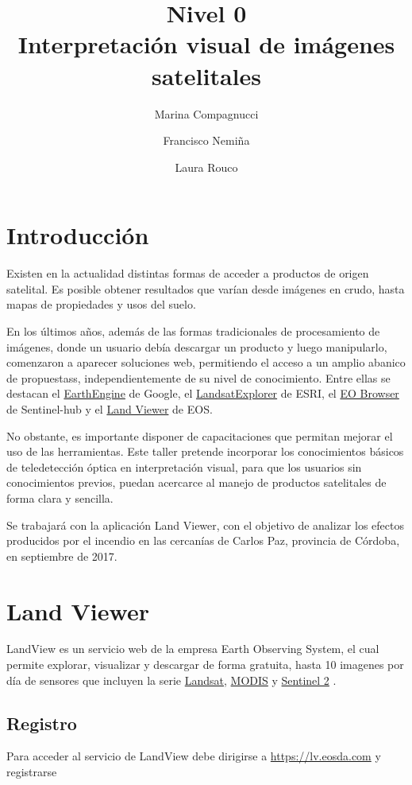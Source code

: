 \documentclass[a4paper,12pt]{book}
\title{{\large Nivel 0} \\ Interpretación visual de imágenes satelitales}
\author{Marina Compagnucci \and Francisco Nemiña \and Laura Rouco}
\begin{document}
\maketitle
\titlepage

\chapter{Introducción}
Existen en la actualidad distintas formas de acceder a productos de origen satelital. Es posible obtener resultados que varían desde imágenes en crudo, hasta mapas de propiedades y usos del suelo.

En los últimos años, además de las formas tradicionales de procesamiento de imágenes, donde un usuario debía descargar un producto y luego manipularlo, comenzaron a aparecer soluciones web, permitiendo el acceso a un amplio abanico de propuestass, independientemente de su nivel de conocimiento. Entre ellas se destacan el \href{https://explorer.earthengine.google.com/#workspace}{EarthEngine} de Google, el \href{http://landsatexplorer.esri.com/}{LandsatExplorer} de ESRI, el \href{http://apps.sentinel-hub.com/eo-browser/}{EO Browser} de Sentinel-hub y el \href{lv.eosda.com}{Land Viewer} de EOS.

No obstante, es importante disponer de capacitaciones que permitan mejorar el uso de las herramientas. Este taller pretende incorporar los conocimientos básicos de teledetección óptica en interpretación visual, para que los usuarios sin conocimientos previos, puedan acercarce al manejo de productos satelitales de forma clara y sencilla.

Se trabajará con la aplicación Land Viewer, con el objetivo de analizar los efectos producidos por el incendio en las cercanías de Carlos Paz, provincia de Córdoba, en septiembre de 2017.

\chapter{Land Viewer}

LandView es un servicio web de la empresa Earth Observing System, el cual permite explorar, visualizar y descargar de forma gratuita, hasta 10 imagenes por día de sensores que incluyen la serie \href{https://landsat.usgs.gov/}{Landsat}, \href{https://lpdaac.usgs.gov/dataset_discovery/modis/modis_products_table/mcd43a4}{MODIS} y \href{https://sentinel.esa.int/web/sentinel/missions/sentinel-2}{Sentinel 2} .

\section{Registro}
Para acceder al servicio de LandView debe dirigirse a \url{https://lv.eosda.com} y registrarse
\end{document}
